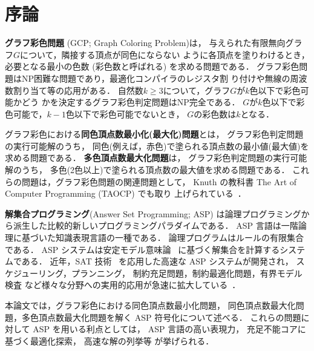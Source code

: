 \chapter{序論}

\textbf{グラフ彩色問題} (GCP; Graph Coloring Problem)は，
与えられた有限無向グラフ$G$について，隣接する頂点が同色にならない
ように各頂点を塗りわけるとき，必要となる最小の色数 (彩色数と呼ばれる)
を求める問題である．
グラフ彩色問題はNP困難な問題であり，最適化コンパイラのレジスタ割
り付けや無線の周波数割り当て等の応用がある．
自然数$k\geq 3$について，グラフ$G$が$k$色以下で彩色可能かどう
かを決定するグラフ彩色判定問題はNP完全である．
$G$が$k$色以下で彩色可能で，$k-1$色以下で彩色可能でないとき，
$G$の彩色数は$k$となる．

グラフ彩色における\textbf{同色頂点数最小化(最大化)問題}とは，
グラフ彩色判定問題の実行可能解のうち，
同色(例えば，赤色)で塗られる頂点数の最小値(最大値)を求める問題である．
\textbf{多色頂点数最大化問題}は，
グラフ彩色判定問題の実行可能解のうち，
多色(2色以上)で塗られる頂点数の最大値を求める問題である．
これらの問題は，グラフ彩色問題の関連問題として，
Knuth の教科書 The Art of Computer Programming (TAOCP) でも取り
上げられている~\cite{Knuth:TAOCP:SAT}．

\textbf{解集合プログラミング}(Answer Set Programming; ASP\cite{%
  Baral03:cambridge,%
  Gelfond88:iclp,%
  Inoue08:jssst,%
  Niemela99:amai})
は論理プログラミングから派生した比較的新しいプログラミングパラダイムである．
ASP 言語は一階論理に基づいた知識表現言語の一種である．
論理プログラムはルールの有限集合である．
ASP システムは安定モデル意味論~\cite{Gelfond88:iclp}
に基づく解集合を計算するシステムである．
近年，SAT 技術~\cite{JSAI:InoueT10}
を応用した高速な ASP システムが開発され，
スケジューリング，プランニング，
制約充足問題，制約最適化問題，有界モデル検査
など様々な分野への実用的応用が急速に拡大している~\cite{ergele16a,anor/Banbara2019}．

本論文では，グラフ彩色における同色頂点数最小化問題，
同色頂点数最大化問題，多色頂点数最大化問題を解く
ASP 符号化について述べる．
これらの問題に対して ASP を用いる利点としては，
ASP 言語の高い表現力，
充足不能コアに基づく最適化探索，
高速な解の列挙等
が挙げられる．

